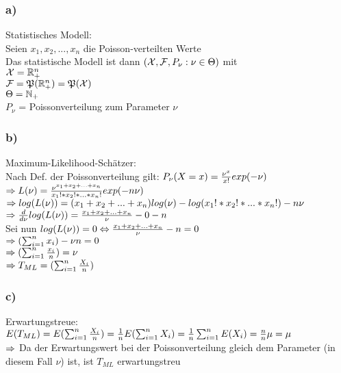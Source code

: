 \documentclass[11pt]{amsart}
\begin{document}
\subsubsection*{a)} Statistisches Modell: \\
Seien $x_1,x_2,...,x_n$ die Poisson-verteilten Werte \\
Das statistische Modell ist dann $(\mathcal{X},\mathcal{F},P_{\nu}:\nu \in \Theta)$ mit \\
$\mathcal{X} = \mathbb{R}_+^n$ \\
$\mathcal{F} = \mathfrak{P}(\mathbb{R}_+^n) = \mathfrak{P}(\mathcal{X})$ \\
$\Theta = \mathbb{N}_+$ \\
$P_{\nu}$ = Poissonverteilung zum Parameter $\nu$ \\
\subsubsection*{b)} 
Maximum-Likelihood-Schätzer: \\
Nach Def. der Poissonverteilung gilt: $P_{\nu}(X=x) = \frac{\nu^x}{x!}exp(-\nu)$ \\
$\Rightarrow L(\nu) = \frac{\nu^{x_1 + x_2 + ... + x_n}}{x_1! * x_2! * ... * x_n!}exp(-n\nu)$ \\
$\Rightarrow log(L(\nu)) = (x_1 + x_2 + ... + x_n)log(\nu) - log(x_1! * x_2! * ... * x_n!) - n\nu$ \\
$\Rightarrow \frac{d}{d\nu}log(L(\nu)) = \frac{x_1 + x_2 + ... + x_n}{\nu} - 0 - n$ \\
Sei nun $log(L(\nu)) = 0 \Leftrightarrow \frac{x_1 + x_2 + ... + x_n}{\nu} - n = 0$ \\
$\Rightarrow (\sum_{i=1}^n x_i) - \nu n = 0$ \\
$\Rightarrow (\sum_{i=1}^n \frac{x_i}{n}) = \nu$ \\
$\Rightarrow T_{ML} = (\sum_{i=1}^n \frac{X_i}{n})$ \\
\subsubsection*{c)}
Erwartungstreue: \\
$E(T_{ML}) = E(\sum_{i=1}^n \frac{X_i}{n}) = \frac{1}{n} E(\sum_{i=1}^n X_i) = \frac{1}{n} \sum_{i=1}^n E(X_i) = \frac{n}{n} \mu = \mu$ \\
$\Rightarrow$ Da der Erwartungswert bei der Poissonverteilung gleich dem Parameter (in diesem Fall $\nu$) ist, ist $T_{ML}$ erwartungstreu \\
\end{document}
